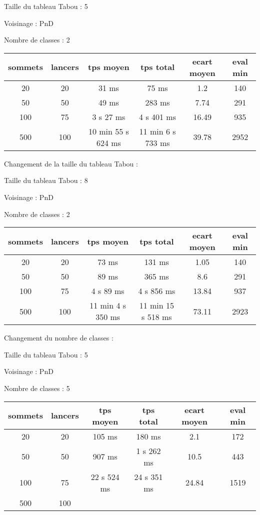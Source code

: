 \documentclass[12pt]{article}
\begin{document}
\bigskip

Taille du tableau Tabou : 5

Voisinage : PnD

Nombre de classes : 2
\bigskip

\begin{tabular}{|c|c|c|c|c|c|}
	\hline 
	sommets & lancers & tps moyen & tps total & ecart moyen & eval min\\
	\hline
	20 & 20 & 31 ms & 75 ms & 1.2 & 140 \\
	\hline
	 50 & 50 & 49 ms & 283 ms & 7.74 & 291 \\
	\hline
	 100 & 75 & 3 s 27 ms & 4 s 401 ms & 16.49 & 935 \\
	\hline
	 500 & 100 & 10 min 55 s 624 ms & 11 min 6 s 733 ms & 39.78 & 2952 \\
	\hline
\end{tabular}
\bigskip

Changement de la taille du tableau Tabou :

Taille du tableau Tabou : 8

Voisinage : PnD

Nombre de classes : 2
\bigskip

\begin{tabular}{|c|c|c|c|c|c|}
	\hline 
	sommets & lancers & tps moyen & tps total & ecart moyen & eval min\\
	\hline
	20 & 20 & 73 ms & 131 ms & 1.05 & 140 \\
	\hline
	 50  &  50  &   89  ms   &  365  ms   &  8.6   &   291  \\
	\hline
	 100  &  75  &  4 s 89   ms   &  4 s  856  ms    &  13.84   &   937  \\
	\hline
	 500 & 100 & 11 min 4 s 350 ms & 11 min 15 s 518 ms & 73.11 & 2923 \\
	\hline
\end{tabular}
\bigskip

Changement du nombre de classes :

Taille du tableau Tabou : 5

Voisinage : PnD

Nombre de classes : 5
\bigskip

\begin{tabular}{|c|c|c|c|c|c|}
	\hline 
	sommets & lancers & tps moyen & tps total & ecart moyen & eval min\\
	\hline
	20 & 20 & 105 ms & 180 ms & 2.1 & 172 \\
	\hline
	 50  &  50  &   907  ms   &  1  s  262  ms   &   10.5  &   443  \\
	\hline
	 100  &  75  & 22 s 524  ms   &  24 s  351  ms    &  24.84   &   1519  \\
	\hline
	 500  &  100  &     &      &     &     \\
	\hline
\end{tabular}
\bigskip
\end{document}
